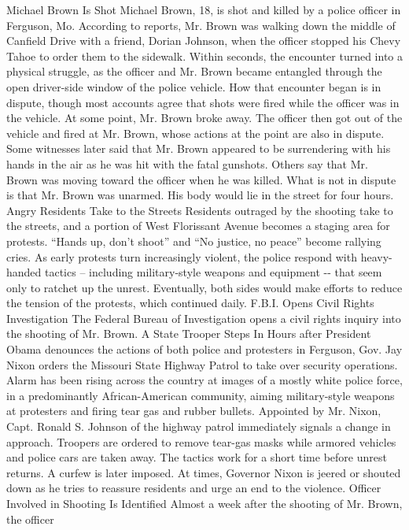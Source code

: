 Michael Brown Is Shot Michael Brown, 18, is shot and killed by a police
officer in Ferguson, Mo. According to reports, Mr. Brown was walking
down the middle of Canfield Drive with a friend, Dorian Johnson, when
the officer stopped his Chevy Tahoe to order them to the sidewalk.
Within seconds, the encounter turned into a physical struggle, as the
officer and Mr. Brown became entangled through the open driver-side
window of the police vehicle. How that encounter began is in dispute,
though most accounts agree that shots were fired while the officer was
in the vehicle. At some point, Mr. Brown broke away. The officer then
got out of the vehicle and fired at Mr. Brown, whose actions at the
point are also in dispute. Some witnesses later said that Mr. Brown
appeared to be surrendering with his hands in the air as he was hit with
the fatal gunshots. Others say that Mr. Brown was moving toward the
officer when he was killed. What is not in dispute is that Mr. Brown was
unarmed. His body would lie in the street for four hours. Angry
Residents Take to the Streets Residents outraged by the shooting take to
the streets, and a portion of West Florissant Avenue becomes a staging
area for protests. ``Hands up, don't shoot'' and ``No justice, no
peace'' become rallying cries. As early protests turn increasingly
violent, the police respond with heavy-handed tactics -- including
military-style weapons and equipment -\/- that seem only to ratchet up
the unrest. Eventually, both sides would make efforts to reduce the
tension of the protests, which continued daily. F.B.I. Opens Civil
Rights Investigation The Federal Bureau of Investigation opens a civil
rights inquiry into the shooting of Mr. Brown. A State Trooper Steps In
Hours after President Obama denounces the actions of both police and
protesters in Ferguson, Gov. Jay Nixon orders the Missouri State Highway
Patrol to take over security operations. Alarm has been rising across
the country at images of a mostly white police force, in a predominantly
African-American community, aiming military-style weapons at protesters
and firing tear gas and rubber bullets. Appointed by Mr. Nixon, Capt.
Ronald S. Johnson of the highway patrol immediately signals a change in
approach. Troopers are ordered to remove tear-gas masks while armored
vehicles and police cars are taken away. The tactics work for a short
time before unrest returns. A curfew is later imposed. At times,
Governor Nixon is jeered or shouted down as he tries to reassure
residents and urge an end to the violence. Officer Involved in Shooting
Is Identified Almost a week after the shooting of Mr. Brown, the officer
